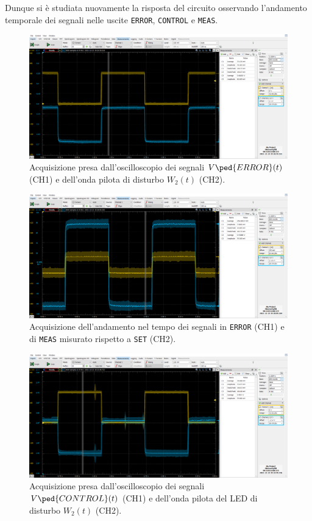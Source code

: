 \documentclass[10pt, a4paper, italian]{article}
\begin{document}
Dunque si è studiata nuovamente la risposta del circuito osservando
l'andamento temporale dei segnali nelle uscite \verb+ERROR+, \verb+CONTROL+ e
\verb+MEAS+.
\begin{figure}[htbp]
    \centering
	\includegraphics[width=\textwidth]{proportional}
    \caption{Acquisizione presa dall'oscilloscopio dei segnali
    $V\ped{ERROR}(t)$ (CH1) e dell'onda pilota di disturbo $W_2 (t)$ (CH2).
    \label{fig: properrnoise}}
\end{figure}
\begin{figure}[htbp]
    \centering
	\includegraphics[width=\textwidth]{proportional.meas}
    \caption{Acquisizione dell'andamento nel tempo dei segnali in
    \texttt{ERROR} (CH1) e di \texttt{MEAS} misurato rispetto a \texttt{SET}
    (CH2).
    \label{fig: properrmeas}}
\end{figure}
\begin{figure}[htbp]
    \centering
	\includegraphics[width=\textwidth]{proportional.control}
    \caption{Acquisizione presa dall'oscilloscopio dei segnali
    $V\ped{CONTROL} (t)$ (CH1) e dell'onda pilota del LED di disturbo
    $W_2 (t)$ (CH2).
    \label{fig: propctrlnoise}}
\end{figure}
\end{document}
